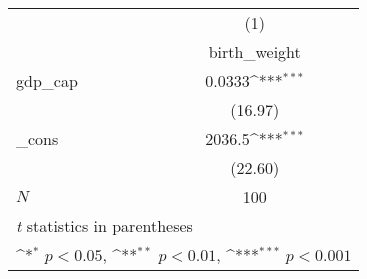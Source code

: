 {
\def\sym#1{\ifmmode^{#1}\else\(^{#1}\)\fi}
\begin{tabular}{l*{1}{c}}
\hline\hline
            &\multicolumn{1}{c}{(1)}\\
            &\multicolumn{1}{c}{birth\_weight}\\
\hline
gdp\_cap     &      0.0333\sym{***}\\
            &     (16.97)         \\
[1em]
\_cons      &      2036.5\sym{***}\\
            &     (22.60)         \\
\hline
\(N\)       &         100         \\
\hline\hline
\multicolumn{2}{l}{\footnotesize \textit{t} statistics in parentheses}\\
\multicolumn{2}{l}{\footnotesize \sym{*} \(p<0.05\), \sym{**} \(p<0.01\), \sym{***} \(p<0.001\)}\\
\end{tabular}
}
